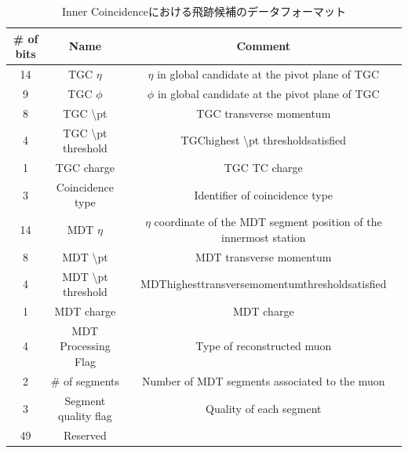 \begin{table}[]
    \centering
    \caption{Inner Coincidenceにおける飛跡候補のデータフォーマット}
    \label{tab:InnerCoin}
    \begin{tabular}{|c|c|c|}
    \hline
    \# of bits & Name                             & Comment                                                                \\ \hline\hline
    14         & TGC $\eta$                       & $\eta$ in global candidate at the pivot plane of TGC                   \\ \hline
    9          & TGC $\phi$                       & $\phi$ in global candidate at the pivot plane of TGC                   \\ \hline
    8          & TGC \textbackslash{}pt           & TGC transverse momentum                                                \\ \hline
    4          & TGC \textbackslash{}pt threshold & TGChighest \textbackslash{}pt thresholdsatisfied                       \\ \hline
    1          & TGC charge                       & TGC TC charge                                                          \\ \hline
    3          & Coincidence type                 & Identifier of coincidence type                                         \\ \hline
    14         & MDT $\eta$                       & $\eta$ coordinate of the MDT segment position of the innermost station \\ \hline
    8          & MDT \textbackslash{}pt           & MDT transverse momentum                                                \\ \hline
    4          & MDT \textbackslash{}pt threshold & MDThighesttransversemomentumthresholdsatisfied                         \\ \hline
    1          & MDT charge                       & MDT charge                                                             \\ \hline
    4          & MDT Processing Flag              & Type of reconstructed muon                                             \\ \hline
    2          & \# of segments                   & Number of MDT segments associated to the muon                          \\ \hline
    3          & Segment quality flag             & Quality of each segment                                                \\ \hline
    49         & Reserved                         &                                                                        \\ \hline
    \end{tabular}
\end{table}

